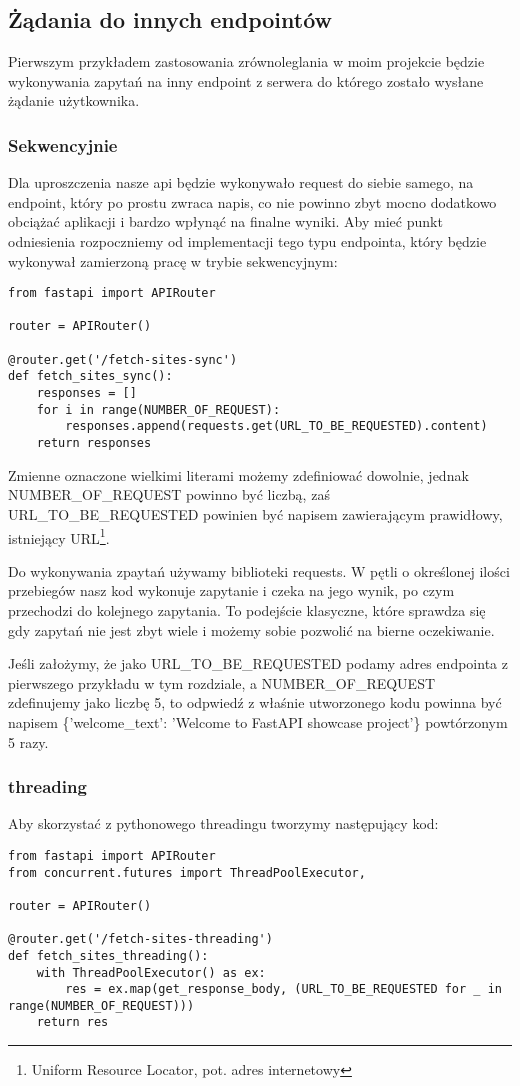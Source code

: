 \subsection{Żądania do innych endpointów}
Pierwszym przykładem zastosowania zrównoleglania w moim projekcie będzie wykonywania zapytań na inny endpoint z serwera do którego zostało wysłane żądanie użytkownika. 
\subsubsection{Sekwencyjnie}
Dla uproszczenia nasze api będzie wykonywało request do siebie samego, na endpoint, który po prostu zwraca napis, co nie powinno zbyt mocno dodatkowo obciążać aplikacji i bardzo wpłynąć na finalne wyniki. Aby mieć punkt odniesienia rozpoczniemy od implementacji tego typu endpointa, który będzie wykonywał zamierzoną pracę w trybie sekwencyjnym:
\begin{lstlisting}
from fastapi import APIRouter

router = APIRouter()

@router.get('/fetch-sites-sync')
def fetch_sites_sync():
    responses = []
    for i in range(NUMBER_OF_REQUEST):
        responses.append(requests.get(URL_TO_BE_REQUESTED).content)
    return responses
\end{lstlisting}
Zmienne oznaczone wielkimi literami możemy zdefiniować dowolnie, jednak NUMBER\_OF\_REQUEST powinno być liczbą, zaś URL\_TO\_BE\_REQUESTED powinien być napisem zawierającym prawidłowy, istniejący URL\footnote{Uniform Resource Locator, pot. adres internetowy}.

Do wykonywania zpaytań używamy biblioteki requests. W pętli o określonej ilości przebiegów nasz kod wykonuje zapytanie i czeka na jego wynik, po czym przechodzi do kolejnego zapytania. To podejście klasyczne, które sprawdza się gdy zapytań nie jest zbyt wiele i możemy sobie pozwolić na bierne oczekiwanie.

Jeśli założymy, że jako URL\_TO\_BE\_REQUESTED podamy adres endpointa z pierwszego przykładu w tym rozdziale, a NUMBER\_OF\_REQUEST zdefinujemy jako liczbę 5, to odpwiedź z właśnie utworzonego kodu powinna być napisem \{'welcome\_text': 'Welcome to FastAPI showcase project'\} powtórzonym 5 razy.

\subsubsection{threading}
Aby skorzystać z pythonowego threadingu tworzymy następujący kod:
\begin{lstlisting}
from fastapi import APIRouter
from concurrent.futures import ThreadPoolExecutor,

router = APIRouter()

@router.get('/fetch-sites-threading')
def fetch_sites_threading():
    with ThreadPoolExecutor() as ex:
        res = ex.map(get_response_body, (URL_TO_BE_REQUESTED for _ in range(NUMBER_OF_REQUEST)))
    return res
\end{lstlisting}

